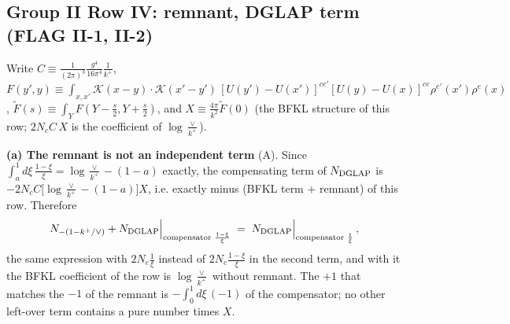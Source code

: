 \documentclass[9pt]{article}
\numberwithin{equation}{section}
\begin{document}
\subsection{Group II Row IV: remnant, DGLAP term (FLAG II-1, II-2)}
\noindent Write $C\equiv\frac{1}{(2\pi)^{3}}\frac{g^{4}}{16\pi^{4}}\frac{1}{k^{+}}$, $F(y',y)\equiv\int_{x,x'}\mathcal K(x-y)\!\cdot\!\mathcal K(x'-y')\,[U(y')-U(x')]^{ce'}[U(y)-U(x)]^{ce}\rho^{e'}(x')\rho^{e}(x)$, $\tilde F(s)\equiv\int_{Y}F(Y-\tfrac s2,Y+\tfrac s2)$, and $X\equiv\frac{4\pi}{k^{2}}\tilde F(0)$ (the BFKL structure of this row; $2N_{c}C\,X$ is the coefficient of $\log\frac{\vee}{k^{+}}$).

\noindent\textbf{(a) The remnant is not an independent term} (A). Since $\int_{a}^{1}d\xi\,\frac{1-\xi}{\xi}=\log\frac{\vee}{k^{+}}-(1-a)$ exactly, the compensating term of $N_{\rm DGLAP}$ is $-2N_{c}C\big[\log\frac{\vee}{k^{+}}-(1-a)\big]X$, i.e. exactly minus (BFKL term $+$ remnant) of this row. Therefore
\begin{align}
N_{-(1-k^{+}/\vee)}+N_{\rm DGLAP}\Big|_{\text{compensator }\frac{1-\xi}{\xi}}\;=\;N_{\rm DGLAP}\Big|_{\text{compensator }\frac{1}{\xi}}\,,\notag
\end{align}
the same expression with $2N_{c}\frac{1}{\xi}$ instead of $2N_{c}\frac{1-\xi}{\xi}$ in the second term, and with it the BFKL coefficient of the row is $\log\frac{\vee}{k^{+}}$ without remnant. The $+1$ that matches the $-1$ of the remnant is $-\int_{0}^{1}d\xi\,(-1)$ of the compensator; no other left-over term contains a pure number times $X$.
\end{document}
